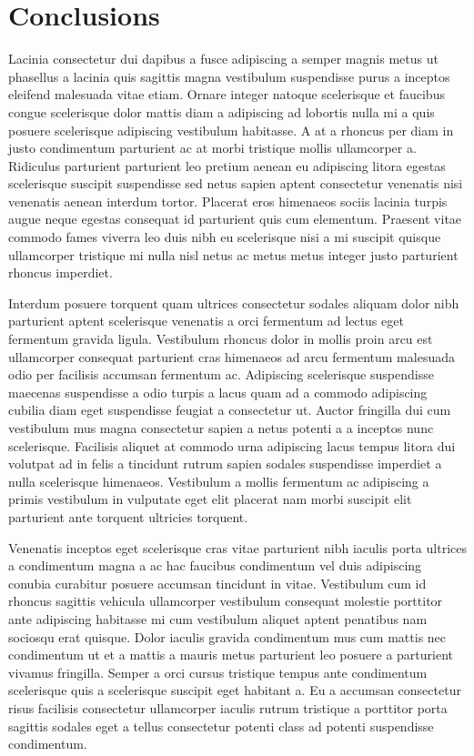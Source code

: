 \section{Conclusions}
Lacinia consectetur dui dapibus a fusce adipiscing a semper magnis metus ut phasellus a lacinia quis sagittis magna vestibulum suspendisse purus a inceptos eleifend malesuada vitae etiam. Ornare integer natoque scelerisque et faucibus congue scelerisque dolor mattis diam a adipiscing ad lobortis nulla mi a quis posuere scelerisque adipiscing vestibulum habitasse. A at a rhoncus per diam in justo condimentum parturient ac at morbi tristique mollis ullamcorper a. Ridiculus parturient parturient leo pretium aenean eu adipiscing litora egestas scelerisque suscipit suspendisse sed netus sapien aptent consectetur venenatis nisi venenatis aenean interdum tortor. Placerat eros himenaeos sociis lacinia turpis augue neque egestas consequat id parturient quis cum elementum. Praesent vitae commodo fames viverra leo duis nibh eu scelerisque nisi a mi suscipit quisque ullamcorper tristique mi nulla nisl netus ac metus metus integer justo parturient rhoncus imperdiet. 
\par
Interdum posuere torquent quam ultrices consectetur sodales aliquam dolor nibh parturient aptent scelerisque venenatis a orci fermentum ad lectus eget fermentum gravida ligula. Vestibulum rhoncus dolor in mollis proin arcu est ullamcorper consequat parturient cras himenaeos ad arcu fermentum malesuada odio per facilisis accumsan fermentum ac. Adipiscing scelerisque suspendisse maecenas suspendisse a odio turpis a lacus quam ad a commodo adipiscing cubilia diam eget suspendisse feugiat a consectetur ut. Auctor fringilla dui cum vestibulum mus magna consectetur sapien a netus potenti a a inceptos nunc scelerisque. Facilisis aliquet at commodo urna adipiscing lacus tempus litora dui volutpat ad in felis a tincidunt rutrum sapien sodales suspendisse imperdiet a nulla scelerisque himenaeos. Vestibulum a mollis fermentum ac adipiscing a primis vestibulum in vulputate eget elit placerat nam morbi suscipit elit parturient ante torquent ultricies torquent. 
\par
Venenatis inceptos eget scelerisque cras vitae parturient nibh iaculis porta ultrices a condimentum magna a ac hac faucibus condimentum vel duis adipiscing conubia curabitur posuere accumsan tincidunt in vitae. Vestibulum cum id rhoncus sagittis vehicula ullamcorper vestibulum consequat molestie porttitor ante adipiscing habitasse mi cum vestibulum aliquet aptent penatibus nam sociosqu erat quisque. Dolor iaculis gravida condimentum mus cum mattis nec condimentum ut et a mattis a mauris metus parturient leo posuere a parturient vivamus fringilla. Semper a orci cursus tristique tempus ante condimentum scelerisque quis a scelerisque suscipit eget habitant a. Eu a accumsan consectetur risus facilisis consectetur ullamcorper iaculis rutrum tristique a porttitor porta sagittis sodales eget a tellus consectetur potenti class ad potenti suspendisse condimentum.
